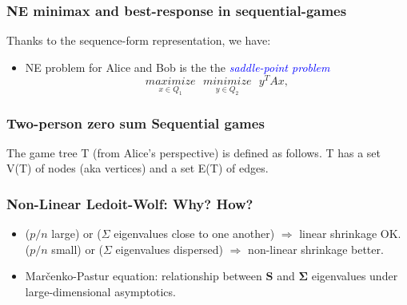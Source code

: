 \documentclass[xcolor=dvipsnames]{beamer}
\def\B#1{\bm{#1}}
\begin{document}
\begin{frame}
  \frametitle{NE minimax and best-response in sequential-games}
Thanks to the sequence-form representation, we have:
\begin{itemize}[<+->]
\item NE problem for Alice and Bob is the the \textit{\textcolor{blue}{saddle-point problem}}
  \begin{equation}
    \underset{x \in Q_1}{maximize}\text{ }\underset{y \in Q_2}{minimize}\text{ }y^TAx,
    \label{eq:minimax_stengel}
  \end{equation}
  
  \end{itemize}
\end{frame}
    
    \begin{frame}
  \frametitle{Two-person zero sum Sequential games}
    The game tree T (from Alice's perspective) is defined as follows.
    T has a set V(T) of nodes (aka vertices) and a set E(T) of edges.
\end{frame}
  

\begin{frame}
  \frametitle{Non-Linear Ledoit-Wolf: Why? How?}

  \begin{itemize}
  \item ($p/n$ large) or ($\Sigma$ eigenvalues close to one another)
    $\Rightarrow$ linear shrinkage OK.\\($p/n$ small) or ($\Sigma$
    eigenvalues dispersed) $\Rightarrow$ non-linear shrinkage better.
  \item Mar\v{c}enko-Pastur equation: relationship between $\B{S}$ and
    $\B{\Sigma}$ eigenvalues under large-dimensional asymptotics.
  \end{itemize}
\end{frame}
\end{document}
